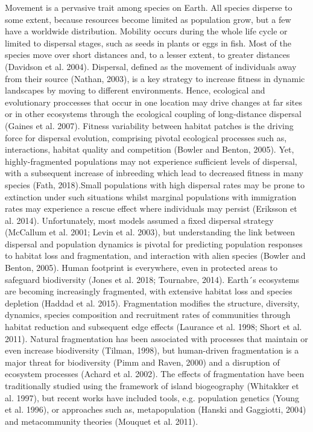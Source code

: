 \documentclass[12pt]{article}
\begin{document}
\begin{flushleft}
{{{{{Movement is a pervasive trait among species on Earth. All species disperse to some extent, because resources become limited as population grow, but a few have a worldwide distribution. Mobility occurs during the whole life cycle or limited to dispersal stages, such as seeds in plants or eggs in fish. Most of the species move over short distances and, to a lesser extent, to greater distances (Davidson et al. 2004). Dispersal, defined as the movement of individuals away from their source (Nathan, 2003), is a key strategy to increase fitness in dynamic landscapes by moving to different environments. Hence, ecological and evolutionary proccesses that occur in one location may drive changes at far sites or in other ecosystems through the ecological coupling of long-distance dispersal (Gaines et al. 2007). Fitness variability between habitat patches is the driving force for dispersal evolution, comprising pivotal ecological processes such as, interactions, habitat quality and competition (Bowler and Benton, 2005). Yet, highly-fragmented populations may not experience sufficient levels of dispersal, with a subsequent increase of inbreeding which lead to decreased fitness in many species (Fath, 2018).Small populations with high dispersal rates may be prone to extinction under such situations  whilst marginal populations with immigration rates may experience a rescue effect where individuals may persist (Eriksson et al. 2014). Unfortunately, most models assumed a fixed dispersal strategy (McCallum et al. 2001; Levin et al. 2003), but understanding the link between dispersal and population dynamics is pivotal for predicting population responses to habitat loss and fragmentation, and interaction with alien species (Bowler and Benton, 2005).
Human footprint is everywhere, even in protected areas to safeguard biodiversity (Jones et al. 2018; Tournabre, 2014). Earth´s ecosystems are becoming increasingly fragmented, with extensive habitat loss and species depletion (Haddad et al. 2015). Fragmentation modifies the structure, diversity, dynamics, species composition and recruitment rates of communities through habitat reduction and subsequent edge effects (Laurance et al. 1998; Short et al. 2011). Natural fragmentation has been associated with processes that maintain or even increase biodiversity (Tilman, 1998), but human-driven fragmentation is a major threat for biodiversity (Pimm and Raven, 2000) and a disruption of ecosystem processes (Achard et al. 2002). The effects of fragmentation have been traditionally studied using the framework of island biogeography (Whitakker et al. 1997), but recent works have included tools, e.g. population genetics (Young et al. 1996), or approaches such as, metapopulation (Hanski and Gaggiotti, 2004) and metacommunity theories (Mouquet et al. 2011).
}}}}}
\end{flushleft}
\end{document}

